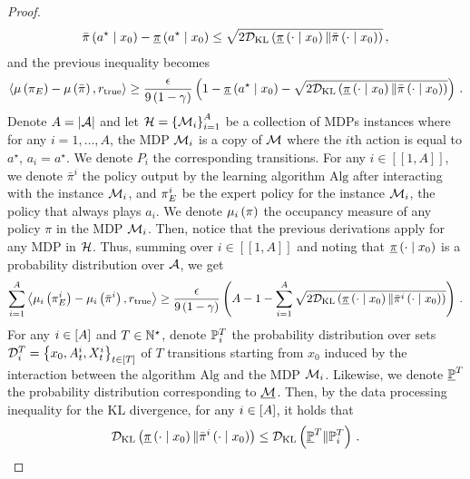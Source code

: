 \begin{proof}
    \begin{align*}
        \bar\pi \left( a^\star \mathrel{}\middle|\mathrel{} x_0 \right) - \underline{\pi} \left( a^\star \mathrel{}\middle|\mathrel{} x_0 \right) \leq \sqrt{2 \mathcal{D}_{\text{KL}} \left( \underline{\pi} \left( \cdot \mathrel{}\middle|\mathrel{} x_0 \right) \| \bar\pi \left( \cdot \mathrel{}\middle|\mathrel{} x_0 \right) \right)}\,,
    \end{align*}
    and the previous inequality becomes
    \begin{align*}
        \left\langle \mu \left( {\pi_E} \right) -  \mu \left( \bar\pi \right), r_{\textup{true}} \right\rangle \geq \frac{\epsilon}{9 \left( 1 - \gamma \right)} \left( 1 - \underline{\pi} \left( a^\star \mathrel{}\middle|\mathrel{} x_0 \right) - \sqrt{2 \mathcal{D}_{\text{KL}} \left( \underline{\pi} \left( \cdot \mathrel{}\middle|\mathrel{} x_0 \right) \| \bar\pi \left( \cdot \mathrel{}\middle|\mathrel{} x_0 \right) \right)} \right)\,.
    \end{align*}
    Denote $A = \left|\mathcal{A}\right|$ and let $\mathcal{H} = \left\{ \mathcal{M}_i \right\}_{i=1}^A$ be a collection of MDPs instances where for any $i = 1, \dots, A$, the MDP $\mathcal{M}_i$ is a copy of $\mathcal{M}$ where the $i$th action is equal to $a^\star$, \ie $a_i = a^\star$. We denote $P_i$ the corresponding transitions. For any $i \in [\![1, A]\!]$, we denote $\bar\pi^i$ the policy output by the learning algorithm $\mathrm{Alg}$ after interacting with the instance $\mathcal{M}_i$, and $\pi_E^i$ be the expert policy for the instance $\mathcal{M}_i$, \ie the policy that always plays $a_i$. We denote $\mu_i \left( \pi \right)$ the occupancy measure of any policy $\pi$ in the MDP $\mathcal{M}_i$. Then, notice that the previous derivations apply for any MDP in $\mathcal{H}$. Thus, summing over $i \in [\![1, A]\!]$ and noting that $\underline{\pi} \left( \cdot \mathrel{}\middle|\mathrel{} x_0 \right)$ is a probability distribution over $\mathcal{A}$, we get
    \begin{align}
        \sum_{i = 1}^A \left\langle \mu_i \left( \pi_E^i \right) - \mu_i \left( \bar\pi^i \right), r_{\textup{true}} \right\rangle \geq \frac{\epsilon}{9 \left( 1 - \gamma \right)} \left( A - 1 - \sum_{i = 1}^A \sqrt{2 \mathcal{D}_{\text{KL}} \left( \underline{\pi} \left( \cdot \mathrel{}\middle|\mathrel{} x_0 \right) \| \bar\pi^i \left( \cdot \mathrel{}\middle|\mathrel{} x_0 \right) \right)} \right)\,. \label{eq:sum_lower_bound}
    \end{align}
    For any $i \in \left[ A \right]$ and $T \in \mathbb{N}^\star$, denote $\mathbb{P}_i^T$ the probability distribution over sets $\mathcal{D}_i^T = \left\{ x_0, A_t^i, X_t^i \right\}_{t \in \left[ T \right]}$ of $T$ transitions starting from $x_0$ induced by the interaction between the algorithm $\mathrm{Alg}$ and the MDP $\mathcal{M}_i$. Likewise, we denote $\underline{\mathbb{P}}^T$ the probability distribution corresponding to $\underline{\mathcal{M}}$. Then, by the data processing inequality for the KL divergence, for any $i \in \left[ A \right]$, it holds that
    \begin{equation*}
        \KL \spr{\underline{\pi} \spr{\cdot \given x_0} \| \bar\pi^i \spr{\cdot \given x_0}} \leq \KL \spr{\underline{\bbP}^T \| \bbP_i^T}\,.

\end{equation*}
\end{proof}
